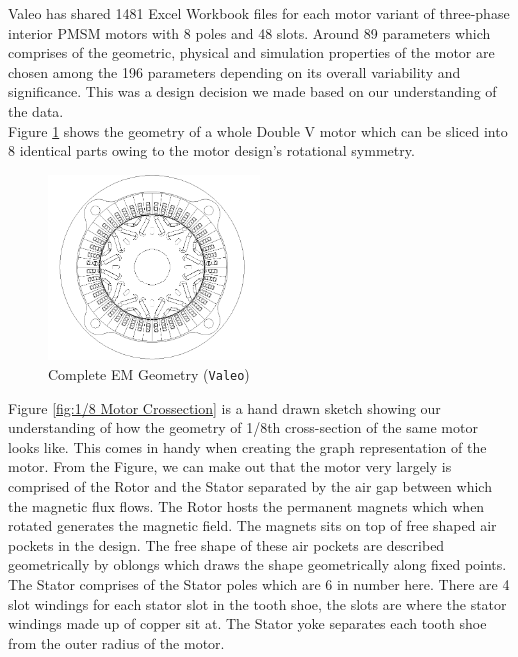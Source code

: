 \documentclass{report} %
\begin{document}
Valeo has shared 1481 Excel Workbook files for each motor variant of three-phase interior \ac{PMSM} motors with 8 poles and 48 slots. 
Around 89 parameters which comprises of the geometric, physical and simulation properties of the motor are chosen among the 196 parameters depending on its overall variability and significance.
This was a design decision we made based on our understanding of the data.\\
Figure \ref{fig:Full Motor} shows the geometry of a whole Double V motor which can be sliced into 8 identical parts owing to the motor design's rotational symmetry.
\begin{figure}[H]
    \centering
    \includegraphics[width=0.5\textwidth]{./ReportImages/FullMotorv2.png} 
    \caption{Complete \ac{EM} Geometry (\texttt{Valeo})}
    \label{fig:Full Motor}
\end{figure}
Figure \ref{fig:1/8 Motor Crossection} is a hand drawn sketch showing our understanding of how the geometry of 1/8th cross-section of the same motor looks like.
This comes in handy when creating the graph representation of the motor.
From the Figure, we can make out that the motor very largely is comprised of the Rotor and the Stator separated by the air gap between which the magnetic flux flows.
The Rotor hosts the permanent magnets which when rotated generates the magnetic field. The magnets sits on top of free shaped air pockets in the design. 
The free shape of these air pockets are described geometrically by oblongs which draws the shape geometrically along fixed points.
The Stator comprises of the Stator poles which are 6 in number here. There are 4 slot windings for each stator slot in the tooth shoe, the slots are where the stator windings made 
up of copper sit at. The Stator yoke separates each tooth shoe from the outer radius of the motor.
\end{document}
